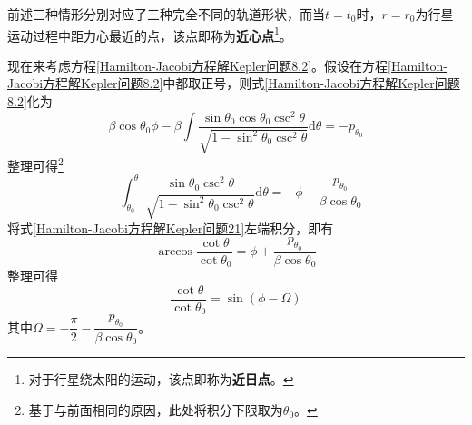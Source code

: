 前述三种情形分别对应了三种完全不同的轨道形状，而当$t=t_0$时，$r=r_0$为行星运动过程中距力心最近的点，该点即称为{\bf 近心点}\footnote{对于行星绕太阳的运动，该点即称为{\bf 近日点}。}。

现在来考虑方程\eqref{Hamilton-Jacobi方程解Kepler问题8.2}。假设在方程\eqref{Hamilton-Jacobi方程解Kepler问题8.2}中都取正号，则式\eqref{Hamilton-Jacobi方程解Kepler问题8.2}化为
\begin{equation*}
	\beta\cos\theta_0\phi - \beta \int \frac{\sin\theta_0\cos\theta_0\csc^2\theta}{\sqrt{1-\sin^2\theta_0\csc^2\theta}}\mathrm{d}\theta = -p_{\theta_0}
\end{equation*}
整理可得\footnote{基于与前面相同的原因，此处将积分下限取为$\theta_0$。}
\begin{equation}
	-\int_{\theta_0}^\theta \frac{\sin\theta_0\csc^2\theta}{\sqrt{1-\sin^2\theta_0\csc^2\theta}} \mathrm{d}\theta = -\phi - \frac{p_{\theta_0}}{\beta\cos\theta_0}
	\label{Hamilton-Jacobi方程解Kepler问题21}
\end{equation}
将式\eqref{Hamilton-Jacobi方程解Kepler问题21}左端积分，即有
\begin{equation}
	\arccos \frac{\cot\theta}{\cot\theta_0} = \phi + \frac{p_{\theta_0}}{\beta\cos \theta_0}
	\label{Hamilton-Jacobi方程解Kepler问题22}
\end{equation}
整理可得
\begin{equation}
	\frac{\cot\theta}{\cot\theta_0} = \sin(\phi-\varOmega)
	\label{Hamilton-Jacobi方程解Kepler问题23}
\end{equation}
其中$\varOmega = -\dfrac{\pi}{2}-\dfrac{p_{\theta_0}}{\beta\cos \theta_0}$。

